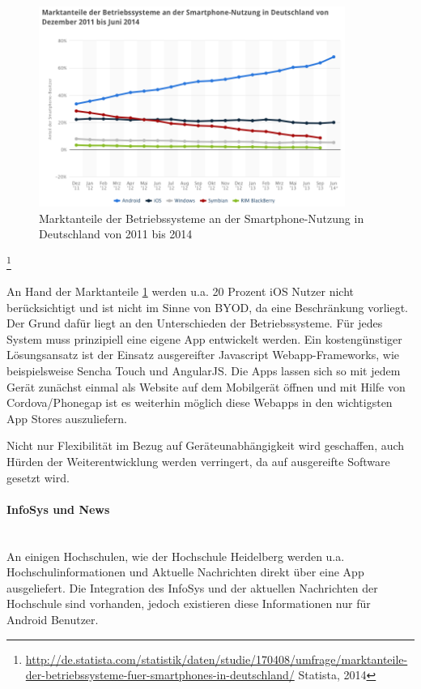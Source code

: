 \begin{figure}[h!]
	\centering
	\includegraphics[width=10cm]{kapitel/gruppe1_2/bilder/marktanteile}
	\caption{Marktanteile der Betriebssysteme an der Smartphone-Nutzung in Deutschland von 2011 bis 2014}
	\label{fig_marktanteile}
\end{figure}
\footnote{\url{http://de.statista.com/statistik/daten/studie/170408/umfrage/marktanteile-der-betriebssysteme-fuer-smartphones-in-deutschland/} Statista, 2014}

An Hand der Marktanteile \ref{fig_marktanteile} werden u.a. 20 Prozent iOS Nutzer nicht berücksichtigt und ist nicht im Sinne von BYOD, da eine Beschränkung vorliegt. Der Grund dafür liegt an den Unterschieden der Betriebssysteme. Für jedes System muss prinzipiell eine eigene App entwickelt werden. Ein kostengünstiger Lösungsansatz ist der Einsatz ausgereifter Javascript Webapp-Frameworks, wie beispielsweise Sencha Touch und AngularJS. Die Apps lassen sich so mit jedem Gerät zunächst einmal als Website auf dem Mobilgerät öffnen und mit Hilfe von Cordova/Phonegap ist es weiterhin möglich diese Webapps in den wichtigsten App Stores auszuliefern.

Nicht nur Flexibilität im Bezug auf Geräteunabhängigkeit wird geschaffen, auch Hürden der Weiterentwicklung werden verringert, da auf ausgereifte Software gesetzt wird.


\paragraph{InfoSys und News}\mbox{}\\ %
An einigen Hochschulen, wie der Hochschule Heidelberg werden u.a. Hochschulinformationen und Aktuelle Nachrichten direkt über eine App ausgeliefert. Die Integration des InfoSys und der aktuellen Nachrichten der Hochschule sind vorhanden, jedoch existieren diese Informationen nur für Android Benutzer.

